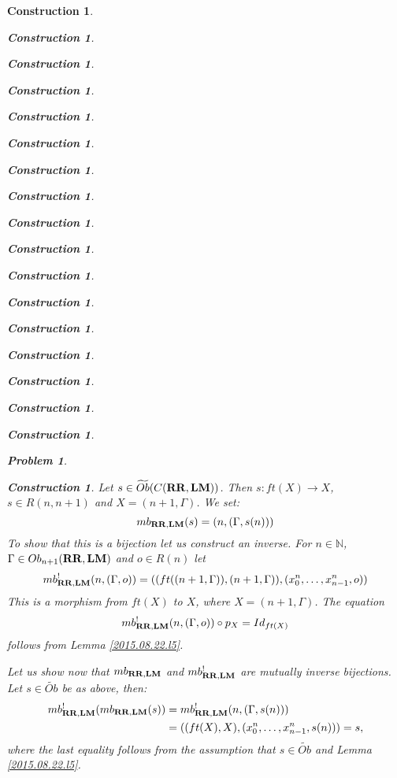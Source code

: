 \documentclass[onecolumn,12pt]{amsart}
\numberwithin{proposition}{subsection}
\newtheorem{problem}[proposition]{Problem}
\newtheorem{construction}[proposition]{Construction}
\newcommand{\sr}{\rightarrow}
\newcommand{\nn}{{\mathbb N}}
\newcommand{\nat}{\nn}
\newcommand{\wt}{\widetilde}
\newcommand{\RR}{{\bf RR}}
\newcommand{\LM}{{\bf LM}}
\begin{document}
\begin{construction}
\begin{construction}
\begin{construction}
\begin{construction}
\begin{construction}
\begin{construction}
\begin{construction}
\begin{construction}
\begin{construction}
\begin{construction}
\begin{construction}
\begin{construction}
\begin{construction}
\begin{construction}
\begin{construction}
\begin{construction}
\begin{construction}
\begin{problem}
\begin{equation}
\end{equation}%
%
\end{problem}
%
\begin{construction}\rm
\label{2015.08.22.constr1}
\label{2014.06.30.l2}
Let $s\in \wt{Ob}(C(\RR,\LM))$. Then $s:ft(X)\sr X$, $s\in R(n,n+1)$ and $X=(n+1,\Gamma)$. We set:
%
$$mb_{\RR,\LM}(s)=(n,(\Gamma, s(n)))$$
%
To show that this is a bijection let us construct an inverse. For $n\in\nat$, $\Gamma\in Ob_{n+1}(\RR,\LM)$ and $o\in R(n)$ let
%
$$mb_{\RR,\LM}^!(n,(\Gamma,o))=((ft((n+1,\Gamma)),(n+1,\Gamma)),(x^{n}_0,\dots,x^{n}_{n-1},o))$$
%
This is a morphism from $ft(X)$ to $X$, where $X=(n+1,\Gamma)$. The equation
$$mb_{\RR,\LM}^!(n,(\Gamma,o))\circ p_X=Id_{ft(X)}$$ follows from Lemma
\ref{2015.08.22.l5}.

Let us show now that $mb_{\RR,\LM}$ and $mb_{\RR,\LM}^!$ are mutually inverse bijections. Let $s\in \wt{Ob}$ be as above, then:
\begin{equation*}
  \begin{split}
    mb_{\RR,\LM}^!(mb_{\RR,\LM}(s))&=mb_{\RR,\LM}^!(n,(\Gamma,s(n)))\\
    &=((ft(X),X),(x^{n}_0,\dots,x^{n}_{n-1},s(n)))=s,
  \end{split}
\end{equation*}
where the last equality follows from the assumption that $s\in \wt{Ob}$ and Lemma \ref{2015.08.22.l5}.


\end{construction}
\end{construction}
\end{construction}
\end{construction}
\end{construction}
\end{construction}
\end{construction}
\end{construction}
\end{construction}
\end{construction}
\end{construction}
\end{construction}
\end{construction}
\end{construction}
\end{construction}
\end{construction}
\end{construction}
\end{construction}
\end{document}
